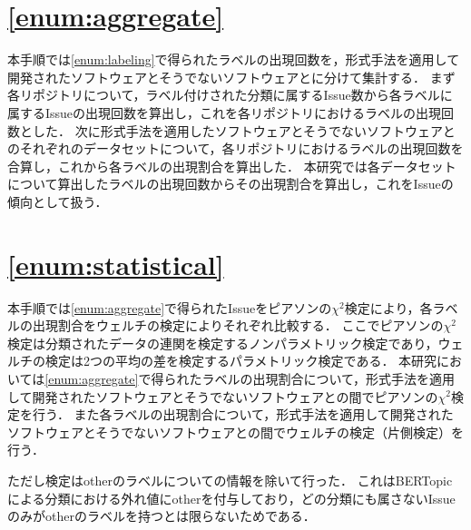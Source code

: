 \documentclass[main]{subfiles}
\begin{document}

\section{\ref{enum:aggregate}}
\label{sec:aggregate}

本手順では\ref{enum:labeling}で得られたラベルの出現回数を，形式手法を適用して開発されたソフトウェアとそうでないソフトウェアとに分けて集計する．
まず各リポジトリについて，ラベル付けされた分類に属するIssue数から各ラベルに属するIssueの出現回数を算出し，これを各リポジトリにおけるラベルの出現回数とした．
次に形式手法を適用したソフトウェアとそうでないソフトウェアとのそれぞれのデータセットについて，各リポジトリにおけるラベルの出現回数を合算し，これから各ラベルの出現割合を算出した．
本研究では各データセットについて算出したラベルの出現回数からその出現割合を算出し，これをIssueの傾向として扱う．


\section{\ref{enum:statistical}}
\label{sec:statistical}

本手順では\ref{enum:aggregate}で得られたIssueをピアソンの\(\chi^2\)検定により，各ラベルの出現割合をウェルチの検定によりそれぞれ比較する．
ここでピアソンの\(\chi^2\)検定は分類されたデータの連関を検定するノンパラメトリック検定であり，ウェルチの検定は2つの平均の差を検定するパラメトリック検定である．
本研究においては\ref{enum:aggregate}で得られたラベルの出現割合について，形式手法を適用して開発されたソフトウェアとそうでないソフトウェアとの間でピアソンの\(\chi^2\)検定を行う．
また各ラベルの出現割合について，形式手法を適用して開発されたソフトウェアとそうでないソフトウェアとの間でウェルチの検定（片側検定）を行う．

ただし検定はotherのラベルについての情報を除いて行った．
これはBERTopicによる分類における外れ値にotherを付与しており，どの分類にも属さないIssueのみがotherのラベルを持つとは限らないためである．
\end{document}
